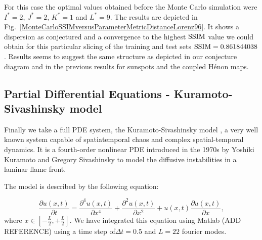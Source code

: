 \documentclass[journal]{IEEEtran}
\begin{document}
For this case the optimal values obtained before the Monte Carlo simulation were $I^*=2$, $J^*=2$, $K^*=1$ and $L^*=9$. The results
are depicted in Fig.\ \ref{MonteCarloSSIMversusParameterMetricDistanceLorenz96}.  It shows a dispersion as conjectured and a convergence to the highest $\textnormal{SSIM}$ value we could obtain for this particular slicing of the training and test sets $\textnormal{SSIM}=
0.861844038$. Results seems to suggest the same structure as depicted in our conjecture diagram and in the previous results for sunspots
and the coupled H\'{e}non maps.

\subsection{Partial Differential Equations - Kuramoto-Sivashinsky model}


Finally we take a full PDE system, the Kuramoto-Sivashinsky model \cite{1976PThPh..55..356K,1977AcAau...4.1177S},
a very well known system capable of spatiatemporal chaos
and complex spatial-temporal dynamics. It is a fourth-order nonlinear PDE introduced in the 1970s by Yoshiki
Kuramoto and Gregory Sivashinsky to model the diffusive instabilities
in a laminar flame front.

The model is described by the following equation:

\begin{equation}
\label{kuramotoSivashinskyequation}
\frac{\partial u(x,t)}{\partial t} = \frac{\partial^4 u(x,t)}{\partial x^4}+\frac{\partial^2 u(x,t)}{\partial x^2}+u(x,t)
\frac{\partial u(x,t)}{\partial x},
\end{equation}
where $x \in [-\frac{L}{2},+\frac{L}{2}]$. We have integrated this equation using Matlab (ADD REFERENCE)
using a time step of$\Delta t=0.5$ and $L=22$ fourier modes.
\end{document}
